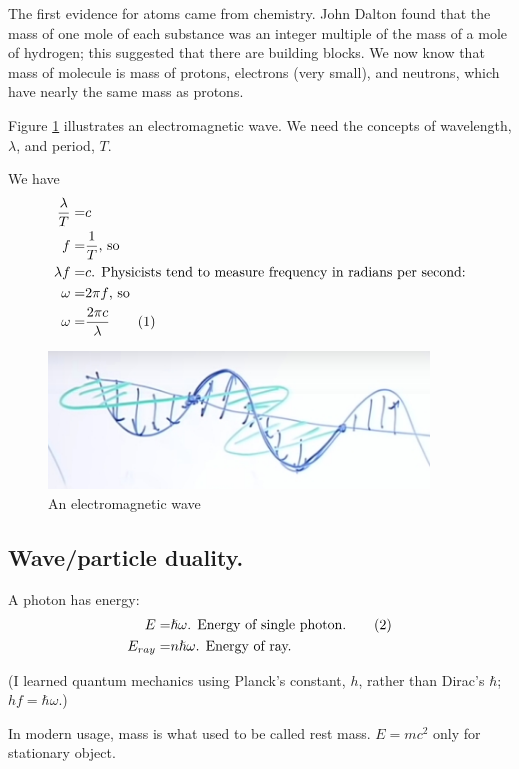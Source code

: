 \documentclass[]{article}
\newcommand\numberthis{\addtocounter{equation}{1}\tag{\theequation}}
\begin{document}
The first evidence for atoms came from chemistry. John Dalton found that the mass of one mole of each substance was an integer multiple of the mass of a mole of hydrogen; this suggested that there are building blocks. We now know that mass of molecule is mass of protons, electrons (very small), and neutrons, which have nearly the same mass as protons. 
 
Figure \ref{fig:em:wave} illustrates an electromagnetic wave. We need the concepts of wavelength, $\lambda$, and period, $T$.

We have
\begin{align*}
	\frac{\lambda}{T}=&c\\
	f=&\frac{1}{T} \text{, so}\\
	\lambda f =& c\text{. Physicists tend to measure frequency in radians per second:}\\
	\omega =& 2 \pi f \text{, so} \\
	\omega =& \frac{2 \pi c}{\lambda} \numberthis \label{eq:omega:lambda}
\end{align*}

\begin{figure}[H]
	\caption{An electromagnetic wave}\label{fig:em:wave}  
	\includegraphics[width=0.9\textwidth]{Wavelength}
\end{figure}

\subsection{Wave/particle duality.}

A photon has energy:
\begin{align*}
	E=&\hslash \omega \text{. Energy of single photon.} \numberthis\label{eq:E_omega}\\
	E_{ray}=&n \hslash \omega \text{. Energy of ray.}
\end{align*}

(I learned quantum mechanics using Planck's constant, $h$, rather than Dirac's $\hbar$; $hf=\hbar\omega$.) 

In modern usage, mass is what used to be called rest mass. $E = m c^2$ only for stationary object.
\end{document}
